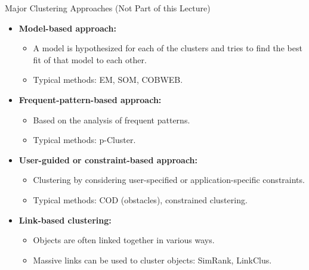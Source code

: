 \begin{frame}{Major Clustering Approaches (Not Part of this Lecture)}
	\begin{itemize}
		\item \textbf{Model-based approach:}
		      \begin{itemize}
			      \item A model is hypothesized for each of the clusters and tries to
			            find the best fit of that model to each other.
			      \item Typical methods: EM, SOM, COBWEB.
		      \end{itemize}
		\item \textbf{Frequent-pattern-based approach:}
		      \begin{itemize}
			      \item Based on the analysis of frequent patterns.
			      \item Typical methods: p-Cluster.
		      \end{itemize}
		\item \textbf{User-guided or constraint-based approach:}
		      \begin{itemize}
			      \item Clustering by considering user-specified or
			            application-specific constraints.
			      \item Typical methods: COD (obstacles), constrained clustering.
		      \end{itemize}
		\item \textbf{Link-based clustering:}
		      \begin{itemize}
			      \item Objects are often linked together in various ways.
			      \item Massive links can be used to cluster objects: SimRank,
			            LinkClus.
		      \end{itemize}
	\end{itemize}
\end{frame}
